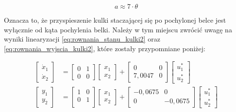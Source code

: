 \begin{equation}
    a \approx 7 \cdot \theta \label{eq:przyspieszenie_kulki3}
\end{equation}

Oznacza to, że przyspieszenie kulki staczającej się po pochylonej belce jest wyłącznie od kąta pochylenia belki. Należy w tym miejscu zwrócić uwagę na wyniki linearyzacji \eqref{eq:rownania_stanu_kulki2} oraz \eqref{eq:rownania_wyjscia_kulki2}, które zostały przypomniane poniżej:

\begin{align*}
    \begin{bmatrix}
        \dot{x}_1 \\ \dot{x}_2
    \end{bmatrix}
    &= \begin{bmatrix}
        0 & 1 \\
        0 & 0
    \end{bmatrix}
    \begin{bmatrix}
        x_1 \\ x_2
    \end{bmatrix}
    +
    \begin{bmatrix}
        0 & 0 \\ 7,0047 & 0
    \end{bmatrix}
    \begin{bmatrix}
        u_1^* \\ u_2^*
    \end{bmatrix}\\
    \begin{bmatrix}
        y_1 \\ y_2
    \end{bmatrix}
    &= \begin{bmatrix}
        1 & 0 \\
        0 & 1 \\
    \end{bmatrix}
    \begin{bmatrix}
        x_1 \\ x_2
    \end{bmatrix}
    + \begin{bmatrix}
        -0,0675 & 0 \\
        0 & -0,0675
    \end{bmatrix}
    \begin{bmatrix}
        u_1^* \\ u_2^*
    \end{bmatrix}
\end{align*}

